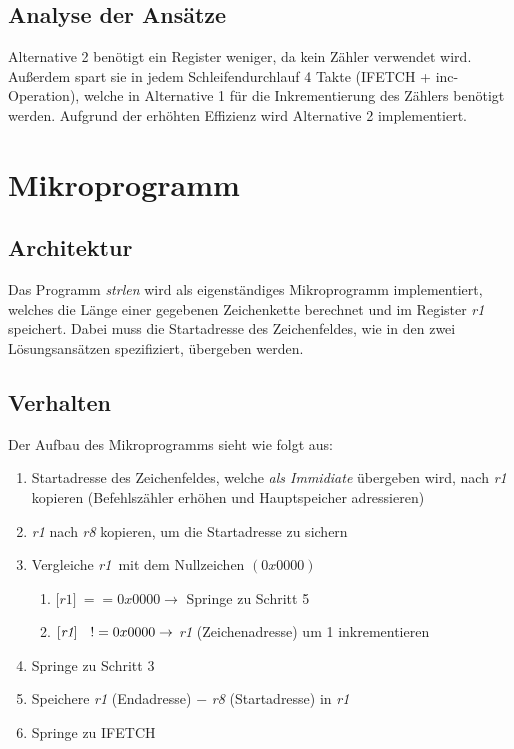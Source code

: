 \documentclass[12pt,a4paper]{article}
\begin{document}
\subsection{Analyse der Ansätze}
Alternative 2 benötigt ein Register weniger, da kein Zähler verwendet wird. Außerdem spart sie in jedem Schleifendurchlauf 4 Takte (IFETCH + inc-Operation), welche in Alternative 1 für die Inkrementierung des Zählers benötigt werden.\newline \newline
Aufgrund der erhöhten Effizienz wird Alternative 2 implementiert.
\newpage
\section{Mikroprogramm}

\subsection{Architektur}
Das Programm \textit{strlen} wird als eigenständiges Mikroprogramm implementiert, welches die Länge einer gegebenen Zeichenkette berechnet und im Register \textit{r1} speichert. Dabei muss die Startadresse des Zeichenfeldes, wie in den zwei Lösungsansätzen spezifiziert, übergeben werden.


\subsection{Verhalten}
Der Aufbau des Mikroprogramms sieht wie folgt aus: 
\begin {enumerate}
\item Startadresse des Zeichenfeldes, welche \emph{als Immidiate} übergeben wird, nach \textit{r1} kopieren (Befehlszähler erhöhen und Hauptspeicher adressieren)
\item \textit{r1} nach \textit{r8} kopieren, um die Startadresse zu sichern
\item Vergleiche \lbrack \textit{r1}\rbrack \ mit dem Nullzeichen \((0x0000)\)
\begin {enumerate}
\item \(\lbrack \textit{r1}\rbrack \ == 0x0000 \rightarrow \) Springe zu Schritt 5
\item \(\lbrack \textit{r1}\rbrack \hspace{6 pt} \ != 0x0000 \rightarrow \) \textit{r1} (Zeichenadresse) um 1 inkrementieren
\end {enumerate}
\item Springe zu Schritt 3
\item Speichere \textit{r1} (Endadresse) \(-\) \textit{r8} (Startadresse) in \textit{r1}
\item Springe zu IFETCH
\end {enumerate}
\end{document}
